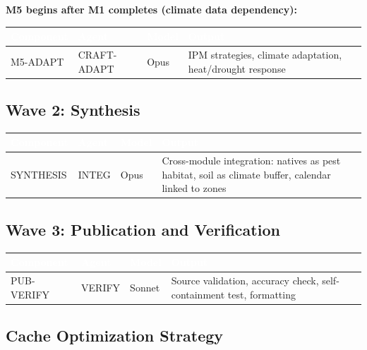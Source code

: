 \documentclass[11pt,letterpaper]{article}
\newcommand{\tableheader}[1]{\textbf{\sffamily\textcolor{white}{#1}}}
\begin{document}
\textbf{M5 begins after M1 completes (climate data dependency):}

\begin{center}
\begin{tabularx}{\textwidth}{L{2.5cm}L{2.5cm}C{1.3cm}X}
\toprule
{}
\tableheader{Component} & \tableheader{Agent} & \tableheader{Model} & \tableheader{Output} \\
\midrule
M5-ADAPT & CRAFT-ADAPT & Opus & IPM strategies, climate adaptation, heat/drought response \\
\bottomrule
\end{tabularx}
\end{center}

\subsection{Wave 2: Synthesis}

\begin{center}
\begin{tabularx}{\textwidth}{L{2.5cm}L{2cm}C{1.3cm}X}
\toprule
{}
\tableheader{Component} & \tableheader{Agent} & \tableheader{Model} & \tableheader{Output} \\
\midrule
SYNTHESIS & INTEG & Opus & Cross-module integration: natives as pest habitat, soil as climate buffer, calendar linked to zones \\
\bottomrule
\end{tabularx}
\end{center}

\subsection{Wave 3: Publication and Verification}

\begin{center}
\begin{tabularx}{\textwidth}{L{2.5cm}L{2cm}C{1.3cm}X}
\toprule
{}
\tableheader{Component} & \tableheader{Agent} & \tableheader{Model} & \tableheader{Output} \\
\midrule
PUB-VERIFY & VERIFY & Sonnet & Source validation, accuracy check, self-containment test, formatting \\
\bottomrule
\end{tabularx}
\end{center}

\subsection{Cache Optimization Strategy}
\end{document}
